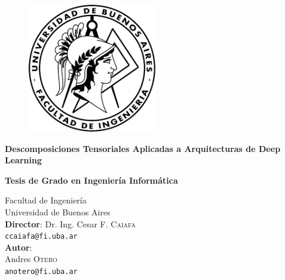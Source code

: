 \documentclass[spanish]{article}
\date{\today}
\theoremstyle{definition}
\theoremstyle{remark}
\numberwithin{equation}{section}
\numberwithin{equation}{section} %
\begin{document}
\begin{titlepage}

\begin{figure}[htb]
\begin{center}
\includegraphics[width=0.5\textwidth]{img/fiuba-logo.png}
\end{center}
\end{figure}

\vspace*{0.25in}
\begin{center}
\begin{Huge}
\textbf{ Descomposiciones Tensoriales Aplicadas a Arquitecturas 
de  Deep Learning }\\
\end{Huge}
\vspace*{0.25in}
\begin{Large}
\textbf{Tesis de Grado en Ingeniería Informática}\\
\end{Large}
  \normalsize Facultad de Ingeniería \\
  \normalsize Universidad de Buenos Aires\\
  
  

\vspace*{0.35in}
 \large
  \textbf{Director}: Dr. Ing. Cesar  F. \textsc{Caiafa}\\
  \normalsize  \texttt{ccaiafa@fi.uba.ar } \\

  \vspace*{0.25in}
 \large
	\textbf{Autor}:\\Andres \textsc{Otero }\\
  \normalsize \texttt{anotero@fi.uba.ar}  \\
  \vspace{10mm}

  \thedate


\end{center}


\end{titlepage}
\end{document}

